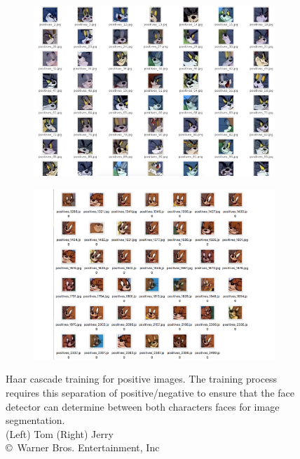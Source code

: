 \documentclass[report, 11pt, oneside]{dissertation}
\begin{document}
\begin{figure}[!htb]
	\begin{subfigure}{0.5\textwidth}
		\centering
		\includegraphics[scale=0.28]{figure_26.pdf}
	\end{subfigure}
	\begin{subfigure}{0.5\textwidth}
		\centering
		\includegraphics[scale=0.35]{figure_27.pdf}
	\end{subfigure}
	\caption[Haar cascade training for positive images.]{Haar cascade training for positive images. The training process requires this separation of positive/negative to ensure that the face detector can determine between both characters faces for image segmentation.\\ (Left) Tom (Right) Jerry \\ \copyright \ Warner Bros. Entertainment, Inc}
	\label{fig:haar_positive_images}
\end{figure}
\end{document}
